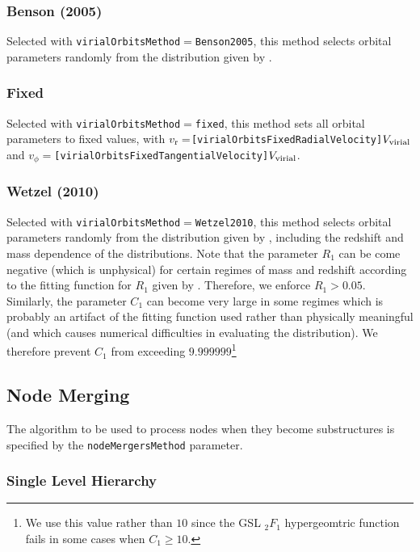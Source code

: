 \subsubsection{Benson (2005)}\label{sec:VirialOrbitsBenson2005}

Selected with {\tt virialOrbitsMethod}$=${\tt Benson2005}, this method selects orbital parameters randomly from the distribution given by \cite{benson_orbital_2005}.

\subsubsection{Fixed}

Selected with {\tt virialOrbitsMethod}$=${\tt fixed}, this method sets all orbital parameters to fixed values, with $v_{\rm r}=${\tt [virialOrbitsFixedRadialVelocity]}$V_{\rm virial}$ and  $v_\phi=${\tt [virialOrbitsFixedTangentialVelocity]}$V_{\rm virial}$.

\subsubsection{Wetzel (2010)}

Selected with {\tt virialOrbitsMethod}$=${\tt Wetzel2010}, this method selects orbital parameters randomly from the distribution given by \cite{wetzel_orbits_2010}, including the redshift and mass dependence of the distributions. Note that the parameter $R_1$ can be come negative (which is unphysical) for certain regimes of mass and redshift according to the fitting function for $R_1$ given by \cite{wetzel_orbits_2010}. Therefore, we enforce $R_1>0.05$. Similarly, the parameter $C_1$ can become very large in some regimes which is probably an artifact of the fitting function used rather than physically meaningful (and which causes numerical difficulties in evaluating the distribution). We therefore prevent $C_1$ from exceeding $9.999999$\footnote{We use this value rather than $10$ since the GSL $_2F_1$ hypergeomtric function fails in some cases when $C_1\ge 10$.}

\subsection{Node Merging}

The algorithm to be used to process nodes when they become substructures is specified by the {\tt nodeMergersMethod} parameter.

\subsubsection{Single Level Hierarchy}

